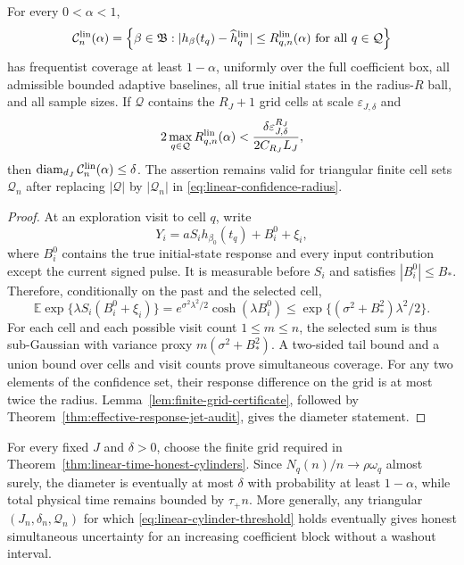 \begin{theorem}
\label{thm:linear-time-honest-cylinders}
For every \(0<\alpha<1\),
\begin{equation}
 \mathcal C_n^{\rm lin}(\alpha)=
 \left\{\beta\in\mathfrak B:
 |h_\beta(t_q)-\widehat h_q^{\rm lin}|
 \le R_{q,n}^{\rm lin}(\alpha)
 \text{ for all }q\in\mathcal Q\right\}
 \label{eq:linear-confidence-set}
\end{equation}
has frequentist coverage at least \(1-\alpha\), uniformly over the full
coefficient box, all admissible bounded adaptive baselines, all true initial
states in the radius-\(R\) ball, and all sample sizes.  If
\(\mathcal Q\) contains the \(R_J+1\) grid cells at scale
\(\varepsilon_{J,\delta}\) and
\begin{equation}
 2\max_{q\in\mathcal Q}R_{q,n}^{\rm lin}(\alpha)
 <\frac{\delta\varepsilon_{J,\delta}^{R_J}}
        {2C_{R_J}L_J},
 \label{eq:linear-cylinder-threshold}
\end{equation}
then
\(\operatorname{diam}_{d_J}\mathcal C_n^{\rm lin}(\alpha)\le\delta\).
The assertion remains valid for triangular finite cell sets
\(\mathcal Q_n\) after replacing \(|\mathcal Q|\) by
\(|\mathcal Q_n|\) in \eqref{eq:linear-confidence-radius}.
\end{theorem}

\begin{proof}
At an exploration visit to cell \(q\), write
\[
 Y_i=aS_ih_{\beta_0}(t_q)+B_i^0+\xi_i,
 \]
where \(B_i^0\) contains the true initial-state response and every input
contribution except the current signed pulse.  It is measurable before
\(S_i\) and satisfies \(|B_i^0|\le B_*\).  Therefore, conditionally on the
past and the selected cell,
\[
 \mathbb E\exp\{\lambda S_i(B_i^0+\xi_i)\}
 =e^{\sigma^2\lambda^2/2}\cosh(\lambda B_i^0)
 \le\exp\{(\sigma^2+B_*^2)\lambda^2/2\}.
\]
For each cell and each possible visit count \(1\le m\le n\), the selected
sum is thus sub-Gaussian with variance proxy
\(m(\sigma^2+B_*^2)\).  A two-sided tail bound and a union bound over cells
and visit counts prove simultaneous coverage.  For any two elements of the
confidence set, their response difference on the grid is at most twice the
radius.  Lemma~\ref{lem:finite-grid-certificate}, followed by
Theorem~\ref{thm:effective-response-jet-audit}, gives the diameter statement.
\end{proof}

\begin{corollary}
\label{cor:linear-time-shrinking-cylinders}
For every fixed \(J\) and \(\delta>0\), choose the finite grid required in
Theorem~\ref{thm:linear-time-honest-cylinders}.  Since
\(N_q(n)/n\to\rho\omega_q\) almost surely, the diameter is eventually at
most \(\delta\) with probability at least \(1-\alpha\), while total physical
time remains bounded by \(\tau_+n\).  More generally, any triangular
\((J_n,\delta_n,\mathcal Q_n)\) for which
\eqref{eq:linear-cylinder-threshold} holds eventually gives honest
simultaneous uncertainty for an increasing coefficient block without a
washout interval.
\end{corollary}
